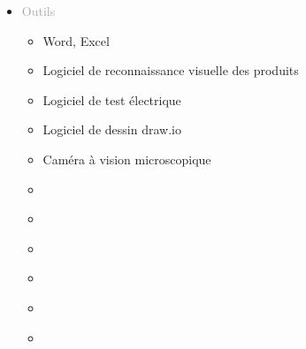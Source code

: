 \documentclass{article}
\renewcommand{\headrulewidth}{0pt} %
\renewcommand{\headrulewidth}{1pt} %
\renewcommand{\headrule}{\color{mainBlue}\hrule width\headwidth height\headrulewidth \vskip-\headrulewidth} %
\begin{document}
\begin{tabular}
\begin{itemize}
        \item \textcolor{darkGray}{Outils}
        \begin{itemize}
        [label={\textcolor{gray!100}{\checkmark}}, topsep=8pt, partopsep=0pt, itemsep=0.5pt, parsep=2pt,after=\vspace*{-\baselineskip}] 
            \item \textcolor{gray!100}{Word, Excel}
            \item \textcolor{gray!100}{Logiciel de reconnaissance visuelle des produits}
            \item \textcolor{gray!100}{Logiciel de test électrique}
            \item \textcolor{gray!100}{Logiciel de dessin draw.io}
            \item \textcolor{gray!100}{Caméra à vision microscopique}
            \item[\textcolor{white}{\checkmark}] \textcolor{gray!100}{} %
            \item[\textcolor{white}{\checkmark}] \textcolor{gray!100}{} %
            \item[\textcolor{white}{\checkmark}] \textcolor{gray!100}{} %
            \item[\textcolor{white}{\checkmark}] \textcolor{gray!100}{} %
            \item[\textcolor{white}{\checkmark}] \textcolor{gray!100}{} %
            \item[\textcolor{white}{\checkmark}] \textcolor{gray!100}{} %



        \end{itemize}
    \end{itemize}
\end{tabular}

\vfill %




\newpage

{
    \fancyhf{} 
    \fancyhead[L] %
    {
        \vspace*{10pt} %
        \textcolor{darkGray}{Dossier de compétences} 
    } 
    \fancyfoot[C]{\thepage\ / \pageref{LastPage}} %
    \renewcommand{\headrulewidth}{2pt} %
    \renewcommand{\headrule}{\color{mainBlue}\hrule width\headwidth height\headrulewidth \vskip-\headrulewidth} %
}
\end{document}
